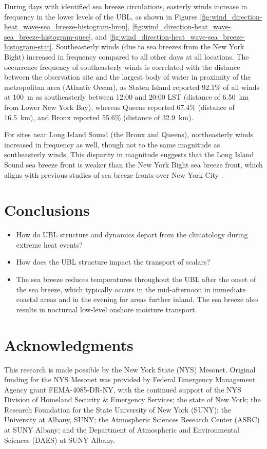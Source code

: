 \documentclass[num-refs]{wiley-article}
\begin{document}
During days with identified sea breeze circulations, easterly winds increase in frequency in the lower levels of the UBL, as shown in Figures \ref{fig:wind_direction-heat_wave-sea_breeze-histogram-bron}, \ref{fig:wind_direction-heat_wave-sea_breeze-histogram-quee}, and \ref{fig:wind_direction-heat_wave-sea_breeze-histogram-stat}. Southeasterly winds (due to sea breezes from the New York Bight) increased in frequency compared to all other days at all locations. The occurrence frequency of southeasterly winds is correlated with the distance between the observation site and the largest body of water in proximity of the metropolitan area (Atlantic Ocean), as Staten Island reported 92.1\% of all winds at \SI{100}{\meter} as southeasterly between 12:00 and 20:00 LST (distance of \SI{6.50}{\kilo\meter} from Lower New York Bay), whereas Queens reported 67.4\% (distance of \SI{16.5}{\kilo\meter}), and Bronx reported 55.6\% (distance of \SI{32.9}{\kilo\meter}). 

For sites near Long Island Sound (the Bronx and Queens), northeasterly winds increased in frequency as well, though not to the same magnitude as southeasterly winds. This disparity in magnitude suggests that the Long Island Sound sea breeze front is weaker than the New York Bight sea breeze front, which aligns with previous studies of sea breeze fronts over New York City \citep{frizzola1963, meir2013}. 

\section{Conclusions}

\begin{itemize}
	\item How do UBL structure and dynamics depart from the climatology during extreme heat events?	
	\item How does the UBL structure impact the transport of scalars?
	\item The sea breeze reduces temperatures throughout the UBL after the onset of the sea breeze, which typically occurs in the mid-afternoon in immediate coastal areas and in the evening for areas further inland. The sea breeze also results in nocturnal low-level onshore moisture transport.
\end{itemize}

\section*{Acknowledgments}
This research is made possible by the New York State (NYS) Mesonet. Original funding for the NYS Mesonet was provided by Federal Emergency Management Agency grant FEMA-4085-DR-NY, with the continued support of the NYS Division of Homeland Security \& Emergency Services; the state of New York; the Research Foundation for the State University of New York (SUNY); the University at Albany, SUNY; the Atmospheric Sciences Research Center (ASRC) at SUNY Albany; and the Department of Atmospheric and Environmental Sciences (DAES) at SUNY Albany.
\end{document}
